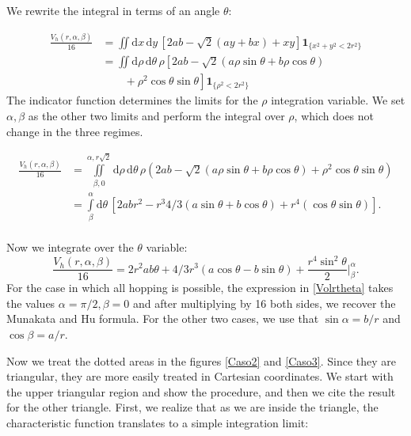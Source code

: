 \documentclass[superscriptaddress,pre,reprint,showpacs,twocolumn]{revtex4-1}
\newcommand{\rd}[1]{\mathrm{d}{#1} \,}
\newcommand{\indicatorsymbol}{\mathbf{1}}
\newcommand{\indicator}[1]{\indicatorsymbol_{ \{   #1 \} } }
\begin{document}
We rewrite the integral in terms of an angle $\theta$:

\begin{equation}\label{app:volcyl}
\begin{split}
\frac{V_h(r,\alpha,\beta)}{16} &=
\iint \rd x \rd y \left[ 2ab-\sqrt{2}(ay+bx)+x y \right]
\indicator{x^2 + y^2 < 2r^2}\\
&=
\iint \rd \rho \rd \theta \rho 
\left[ 2ab -\sqrt{2}(a\rho\sin\theta+b\rho\cos\theta) \right. \\
& \qquad + \left. \rho^2 \cos\theta\sin\theta \right]
\indicator{\rho^2<2r^2 }
\end{split}
\end{equation}
The indicator function determines the limits for the $\rho$ integration variable.
We set $\alpha, \beta$ as the other two limits and perform the
integral over $\rho$,  which does not change in the three regimes.
\begin{widetext}
\begin{equation}
  \begin{split}
    \frac{V_h(r,\alpha,\beta)}{16} &=
    \iint\limits_{\beta,0}^{\alpha,r\sqrt{2}} \rd \rho \rd \theta \rho
    \left( 2ab -\sqrt{2}(a\rho\sin\theta+b\rho\cos\theta) 
    +\rho^2 \cos\theta\sin\theta \right)\\
 &=\int\limits_\beta^{\alpha}  \rd \theta  
\left[ 2abr^2 - r^3 4/3 (a\sin\theta+b\cos\theta)+r^4 (\cos\theta\sin\theta) \right].\\
\end{split}
\end{equation}
\end{widetext}
Now we integrate over the $\theta$ variable:
\begin{equation}\label{Volrtheta}
  \frac{V_h(r,\alpha,\beta)}{16} = 2r^2ab\theta
  +4/3r^3(a\cos\theta-b\sin\theta)
  +\frac{r^4 \sin^2\theta}{2} \Bigg\vert_\beta^\alpha.
\end{equation}
For the case in which all hopping is possible, the expression in \eqref{Volrtheta}
takes the values $\alpha=\pi/2, \beta=0$ and after multiplying by 16 both sides,
we recover the Munakata and Hu formula. For the other two cases, we use that
$\sin \alpha = b / r$ and $\cos \beta = a / r$.


Now we treat the dotted areas in the figures \ref{Caso2} and \ref{Caso3}. Since they are triangular, they
are more easily treated in Cartesian coordinates. We start with the upper
triangular region
and show the procedure, and then we cite the result for the
other triangle.
First, we realize that as we are inside the triangle, the characteristic function
translates to a simple integration limit:
\end{document}

